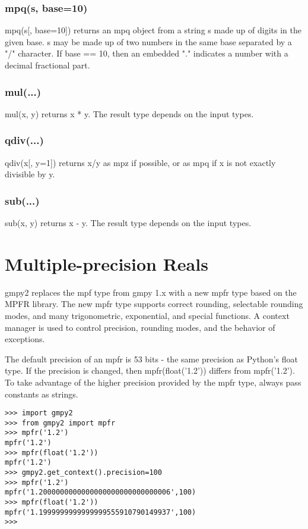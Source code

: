 \subsubsection{mpq(s, base=10)}
mpq(s[, base=10]) returns an mpq object from a string s made up of digits in the given base. s may be made up of two numbers in the same base separated by a "/" character. If base == 10, then an embedded "." indicates a number with a decimal fractional part.

\subsubsection{mul(...)}

mul(x, y) returns x * y. The result type depends on the input types.

\subsubsection{qdiv(...)}

qdiv(x[, y=1]) returns x/y as mpz if possible, or as mpq if x is not exactly divisible by y.

\subsubsection{sub(...)}

sub(x, y) returns x - y. The result type depends on the input types.






\newpage
\section{Multiple-precision Reals}


gmpy2 replaces the mpf type from gmpy 1.x with a new mpfr type based on the MPFR
library. The new mpfr type supports correct rounding, selectable rounding modes, and many
trigonometric, exponential, and special functions. A context manager is used to control
precision, rounding modes, and the behavior of exceptions.

\vpara
The default precision of an mpfr is 53 bits - the same precision as Python's float type. If the precision is changed, then mpfr(float('1.2')) differs from mpfr('1.2'). To take
advantage of the higher precision provided by the mpfr type, always pass constants as
strings.

\begin{lstlisting}
>>> import gmpy2
>>> from gmpy2 import mpfr
>>> mpfr('1.2')
mpfr('1.2')
>>> mpfr(float('1.2'))
mpfr('1.2')
>>> gmpy2.get_context().precision=100
>>> mpfr('1.2')
mpfr('1.2000000000000000000000000000006',100)
>>> mpfr(float('1.2'))
mpfr('1.1999999999999999555910790149937',100)
>>>
\end{lstlisting}


